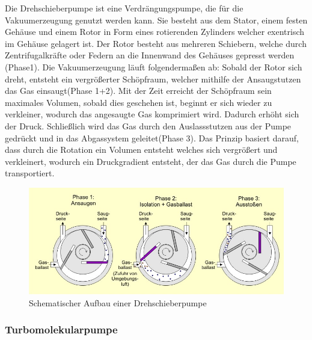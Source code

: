 Die Drehschieberpumpe ist eine Verdrängungspumpe, die für die Vakuumerzeugung genutzt werden kann.
Sie besteht aus dem Stator, einem festen Gehäuse und einem Rotor in Form eines rotierenden
Zylinders welcher exentrisch im Gehäuse gelagert ist. Der Rotor besteht aus mehreren Schiebern, welche durch Zentrifugalkräfte 
oder Federn an die Innenwand des Gehäuses gepresst werden (Phase1). Die Vakuumerzeugung läuft folgendermaßen ab:
Sobald der Rotor sich dreht, entsteht ein vergrößerter Schöpfraum, welcher mithilfe der Ansaugstutzen das Gas
einsaugt(Phase 1+2). Mit der Zeit erreicht der Schöpfraum sein maximales Volumen, sobald dies geschehen ist, beginnt er sich wieder zu 
verkleiner, wodurch das angesaugte Gas komprimiert wird. Dadurch erhöht sich der Druck. Schließlich wird das Gas durch den Auslassstutzen 
aus der Pumpe gedrückt und in das Abgassystem geleitet(Phase 3). Das Prinzip basiert darauf, dass durch die Rotation ein Volumen entsteht welches sich vergrößert 
und verkleinert, wodurch ein Druckgradient entsteht, der das Gas durch die Pumpe transportiert.
\cite{drehschieberpumperehschieberpumpe}

\begin{figure}
    \includegraphics[width=\textwidth]{bilder/pumpe.jpeg}
    \caption{Schematischer Aufbau einer Drehschieberpumpe}
\end{figure}


\subsubsection{Turbomolekularpumpe}

